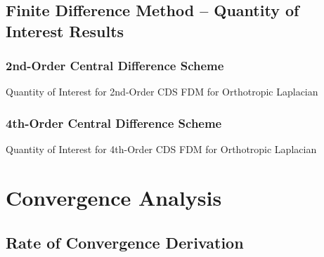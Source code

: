 \documentclass[10pt]{article}		%
\numberwithin{equation}{section}
\begin{document}
\newpage

\subsection{Finite Difference Method -- Quantity of Interest Results}

\subsubsection{2nd-Order Central Difference Scheme}

\begin{table}[H]
	\flushleft
	\caption{Quantity of Interest for 2nd-Order CDS FDM for Orthotropic Laplacian}		
	
	
\end{table}

\newpage

\subsubsection{4th-Order Central Difference Scheme}

\begin{table}[H]
	\flushleft
	\caption{Quantity of Interest for 4th-Order CDS FDM for Orthotropic Laplacian}	
	
	
	
\end{table}

\newpage

\section{Convergence Analysis}

\subsection{Rate of Convergence Derivation}
\end{document}
